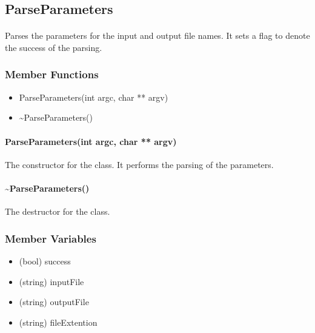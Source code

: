 \hypertarget{fileconversion_parseparameters}
{
    \label{fileconversion_parseparameters}
}

\subsection{ParseParameters}
    \paragraph{}
        Parses the parameters for the input and output file names.  It sets a flag to denote the success of the parsing.

    \subsubsection{Member Functions}

        \begin{itemize}
            \item ParseParameters(int argc, char ** argv)
            \item \textasciitilde ParseParameters()
        \end{itemize}

        \paragraph{ParseParameters(int argc, char ** argv)}
            \hfill \break
            The constructor for the class.  It performs the parsing of the parameters.   
        
        \paragraph{\textasciitilde ParseParameters()}
            \hfill \break
            The destructor for the class.

    \subsubsection{Member Variables}
        
        \begin{itemize}
            \item (bool) success
            \item (string) inputFile
            \item (string) outputFile
            \item (string) fileExtention
        \end{itemize}

